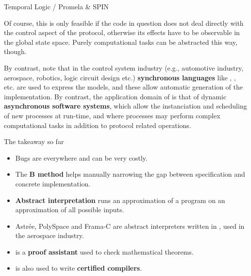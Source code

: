 \documentclass[compress,dvips,xcolor={dvipsnames},t]{beamer}
\begin{document}
%
\begin{frame}{Temporal Logic / Promela \& SPIN}

Of course, this is only feasible if the code in question does not deal
directly with the control aspect of the protocol, otherwise its
effects have to be observable in the global state space. Purely
computational tasks can be abstracted this way, though.

\bigskip

By contrast, note that in the control system industry (e.g.,
automotive industry, aerospace, robotics, logic circuit design etc.)
\textbf{synchronous languages} like \Esterel, \Lustre, \Simulink
etc. are used to express the models, and these allow automatic
generation of the implementation. By contrast, the application domain
of \SPIN is that of dynamic \textbf{asynchronous software systems},
which allow the instanciation and scheduling of new processes at
run\hyp{}time, and where processes may perform complex computational
tasks in addition to protocol related operations.

\end{frame}

%
\begin{frame}{The takeaway so far}

  \begin{itemize}

    \item Bugs are everywhere and can be very costly.

    \item The \textbf{B method} helps manually narrowing the gap
      between specification and concrete implementation.

    \item \textbf{Abstract interpretation} runs an approximation of a
      program on an approximation of all possible inputs.

    \item Astrée, PolySpace and Frama-C are abstract interpreters
      written in \OCaml, used in the aerospace industry.

    \item \Coq is a \textbf{proof assistant} used to check
      mathematical theorems.

    \item \Coq is also used to write \textbf{certified compilers}.

  \end{itemize}

\end{frame}
\end{document}
